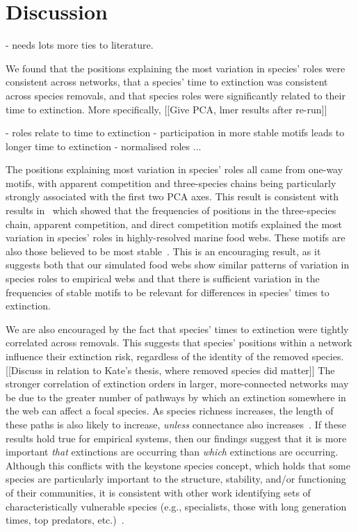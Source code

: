 \documentclass[12pt]{article}
\begin{document}
\section{Discussion}

	- needs lots more ties to literature.


	We found that the positions explaining the most variation in species' roles were consistent across networks, that a species' time to extinction was consistent across species removals, and that species roles were significantly related to their time to extinction. More specifically, [[Give PCA, lmer results after re-run]]


	- roles relate to time to extinction
	- participation in more stable motifs leads to longer time to extinction
	- normalised roles ... 


	The positions explaining most variation in species' roles all came from one-way motifs, with apparent competition and three-species chains being particularly strongly associated with the first two PCA axes. This result is consistent with results in~\citet{Cirtwill2018EcolLett} which showed that the frequencies of positions in the three-species chain, apparent competition, and direct competition motifs explained the most variation in species' roles in highly-resolved marine food webs. These motifs are also those believed to be most stable~\citep{Stouffer2007,Borrelli2015a}. This is an encouraging result, as it suggests both that our simulated food webs show similar patterns of variation in species roles to empirical webs and that there is sufficient variation in the frequencies of stable motifs to be relevant for differences in species' times to extinction.


	We are also encouraged by the fact that species' times to extinction were tightly correlated across removals. This suggests that species' positions within a network influence their extinction risk, regardless of the identity of the removed species.  [[Discuss in relation to Kate's thesis, where removed species did matter]] The stronger correlation of extinction orders in larger, more-connected networks may be due to the greater number of pathways by which an extinction somewhere in the web can affect a focal species. As species richness increases, the length of these paths is also likely to increase, \emph{unless} connectance also increases~\citep{}. If these results hold true for empirical systems, then our findings suggest that it is more important \emph{that} extinctions are occurring than \emph{which} extinctions are occurring. Although this conflicts with the keystone species concept, which holds that some species are particularly important to the structure, stability, and/or functioning of their communities, it is consistent with other work identifying sets of characteristically vulnerable species (e.g., specialists, those with long generation times, top predators, etc.)~\citep{}.
\end{document}
